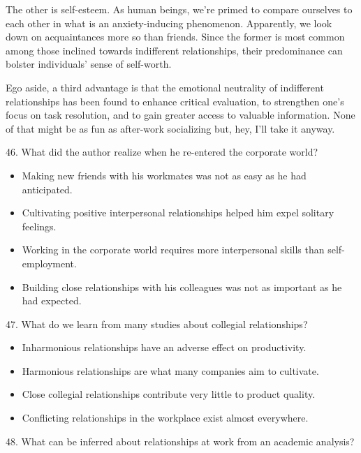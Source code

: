 \documentclass[UTF8,11pt]{ctexart}
\begin{document}
The other is self-esteem. As human beings, we’re primed to compare ourselves to each other in what is an anxiety-inducing phenomenon. Apparently, we look down on acquaintances more so than friends. Since the former is most common among those inclined towards indifferent relationships, their predominance can bolster individuals’ sense of self-worth.


Ego aside, a third advantage is that the emotional neutrality of indifferent relationships has been found to enhance critical evaluation, to strengthen one’s focus on task resolution, and to gain greater access to valuable information. None of that might be as fun as after-work socializing but, hey, I’ll take it anyway.


46. What did the author realize when he re-entered the corporate world?


\begin{itemize}[leftmargin=2em,itemsep=.2em,topsep=.4em]\item[A.] Making new friends with his workmates was not as easy as he had anticipated.
\item[B.] Cultivating positive interpersonal relationships helped him expel solitary feelings.
\item[C.] Working in the corporate world requires more interpersonal skills than self-employment.
\item[D.] Building close relationships with his colleagues was not as important as he had expected.
\end{itemize}

47. What do we learn from many studies about collegial relationships?


\begin{itemize}[leftmargin=2em,itemsep=.2em,topsep=.4em]\item[A.] Inharmonious relationships have an adverse effect on productivity.
\end{itemize}

\begin{itemize}[leftmargin=2em,itemsep=.2em,topsep=.4em]\item[B.] Harmonious relationships are what many companies aim to cultivate.
\item[C.] Close collegial relationships contribute very little to product quality.
\item[D.] Conflicting relationships in the workplace exist almost everywhere.
\end{itemize}

48. What can be inferred about relationships at work from an academic analysis?
\end{document}
